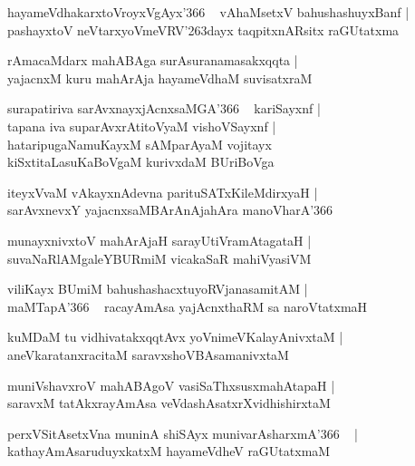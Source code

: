 \documentclass[twoside,12pt,openright]{book}
\def\S{\char'263}
\newcounter{shloka}[chapter]
\begin{document}
\begin{shloka}%
hayameVdhakarxtoVroyxVgAyx\char'366 ~ vAhaMsetxV bahushashuyxBanf |\\
pashayxtoV neVtarxyoVmeVRV\S dayx taqpitxnARsitx raGUtatxma
\end{shloka}

\begin{shloka}%
rAmacaMdarx mahABAga surAsuranamasakxqqta |\\
yajacnxM kuru mahArAja hayameVdhaM suvisatxraM 
\end{shloka}

\begin{shloka}%
surapatiriva sarAvxnayxjAcnxsaMGA\char'366 ~ kariSayxnf |\\
tapana iva suparAvxrAtitoVyaM vishoVSayxnf |\\
hataripugaNamuKayxM sAMparAyaM vojitayx\\
kiSxtitaLasuKaBoVgaM kurivxdaM BUriBoVga
\end{shloka}

\begin{shloka}%
iteyxVvaM vAkayxnAdevna parituSATxKileMdirxyaH |\\
sarAvxnevxY yajacnxsaMBArAnAjahAra manoVharA\char'366
\end{shloka}

\begin{shloka}%
munayxnivxtoV mahArAjaH sarayUtiVramAtagataH |\\
suvaNaRlAMgaleYBURmiM vicakaSaR mahiVyasiVM 
\end{shloka}

\begin{shloka}%
viliKayx BUmiM bahushashacxtuyoRVjanasamitAM |\\
maMTapA\char'366 ~ racayAmAsa yajAcnxthaRM sa naroVtatxmaH
\end{shloka}

\begin{shloka}%
kuMDaM tu vidhivatakxqqtAvx yoVnimeVKalayAnivxtaM |\\
aneVkaratanxracitaM saravxshoVBAsamanivxtaM
\end{shloka}

\begin{shloka}%
muniVshavxroV mahABAgoV vasiSaThxsusxmahAtapaH |\\
saravxM tatAkxrayAmAsa veVdashAsatxrXvidhishirxtaM 
\end{shloka}

\begin{shloka}%
perxVSitAsetxVna muninA shiSAyx munivarAsharxmA\char'366 ~ |\\
kathayAmAsaruduyxkatxM hayameVdheV raGUtatxmaM 
\end{shloka}
\end{document}
